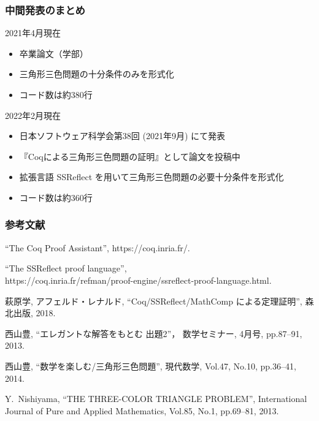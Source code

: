 \documentclass[dvipdfmx,cjk]{beamer}
\begin{document}
\begin{frame}
  \frametitle{中間発表のまとめ}
  \begin{exampleblock}{2021年4月現在}
    \begin{itemize}
    \item 卒業論文（学部）
    \item 三角形三色問題の十分条件のみを形式化
    \item コード数は約380行  
    \end{itemize}
  \end{exampleblock}
  \vfill
  \begin{block}{2022年2月現在}
    \begin{itemize}
    \item
      日本ソフトウェア科学会第38回 (2021年9月) にて発表
    \item
      『Coqによる三角形三色問題の証明』として論文を投稿中
    \item
      拡張言語 SSReflect を用いて三角形三色問題の必要十分条件を形式化
    \item
      コード数は約360行
    \end{itemize}
  \end{block}
  \vfill
\end{frame}

\begin{frame}
  \frametitle{参考文献}
  \begin{thebibliography}{99}
    ``The Coq Proof Assistant'',
    https://coq.inria.fr/. 

    ``The SSReflect proof language'',
    \\
    https://coq.inria.fr/refman/proof-engine/ssreflect-proof-language.html. 
    
    萩原学, アフェルド・レナルド, 
    ``Coq/SSReflect/MathComp による定理証明'',
    森北出版,
    2018. 
    
    西山豊,
    ``エレガントな解答をもとむ 出題2''，
    数学セミナー,
    4月号, pp.87--91, 2013.
    
    西山豊,
    ``数学を楽しむ/三角形三色問題'',
    現代数学,
    Vol.47, No.10, pp.36--41, 2014.
    
    Y.~Nishiyama,
    ``THE THREE-COLOR TRIANGLE PROBLEM'', 
    International Journal of Pure and Applied Mathematics,
    Vol.85, No.1, pp.69--81, 2013.
  \end{thebibliography}
\end{frame}
\end{document}
